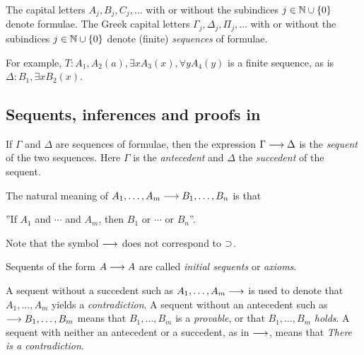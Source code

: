 \documentclass[11pt,a4paper]{article}
\begin{document}
\begin{definition}\label{def:alphabet of formulae}
    The capital letters \(A_j, B_j, C_j, \ldots\) with or without the subindices
    \(j \in \mathbb{N}\cup\{0\}\) denote formulae. The Greek capital letters
    \(\Gamma_j, \Delta_j, \Pi_j,\ldots\) with or without the subindices
    \(j\in\mathbb{N}\cup\{0\}\) denote (finite) \emph{sequences} of formulae.
\end{definition}

For example, \(T: A_1, A_2(a), \exists x A_3(x), \forall y A_4(y)\) is a finite sequence,
as is \(\Delta: B_1, \exists x B_2(x)\).


\subsection{\texorpdfstring{Sequents, inferences and proofs in \LK}{Sequents, inferences and proofs in LK}}

\begin{definition}%
    \label{def:sequent}
    If \(\Gamma\) and \(\Delta\) are sequences of formulae,
    then the expression \(\Gamma\longrightarrow\Delta\) is the \emph{sequent} of the two sequences.
    Here \(\Gamma\) is the \emph{antecedent} and \(\Delta\) the \emph{succedent}
    of the sequent.
\end{definition}

The natural meaning of \(A_1, \ldots,A_m\longrightarrow B_1,\ldots,B_n\) is that
\begin{center}
''If \(A_1\) and \(\cdots\) and \(A_m\), then \(B_1\) or \(\cdots\) or \(B_n\)''.
\end{center}
Note that the symbol \(\longrightarrow\) does not correspond to \(\supset\).

\begin{definition}[Axioms]%
    \label{def:axiom}
    Sequents of the form \(A\longrightarrow A\) are called \emph{initial sequents} or \emph{axioms}.
\end{definition}

\begin{definition}%
    \label{def:contradiction and provability}
    A sequent without a succedent such as \(A_1, \ldots,A_m\longrightarrow\)
    is used to denote that \(A_1, \ldots,A_m\) yields a \emph{contradiction}.
    A sequent without an antecedent such as \(\longrightarrow B_1,\ldots,B_m\) means that
    \(B_1,\ldots,B_m\) is a \emph{provable}, or that \(B_1,\ldots,B_m\) \emph{holds}.
    A sequent with neither an antecedent or a succedent, as in \(\longrightarrow\),
    means that \emph{There is a contradiction}.
\end{definition}
\end{document}
